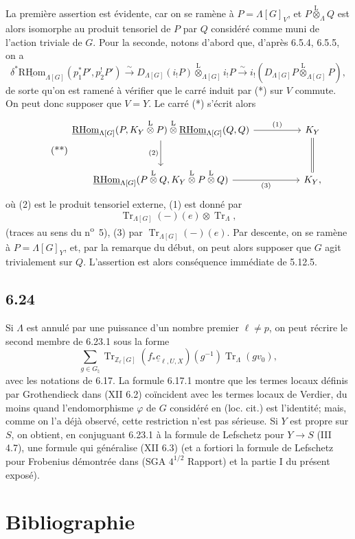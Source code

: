 \documentclass[11pt]{article}
\providecommand{\RHom}{\mathrm{RHom}}
\providecommand{\uRHom}{\underline{\RHom}}
\providecommand{\Tr}{\operatorname{Tr}}
\providecommand{\Tr}{\operatorname{Tr}}
\providecommand{\lten}{\overset{\mathrm L}{\otimes}}
\providecommand{\Tr}{\operatorname{Tr}}
\providecommand{\RHom}{\mathrm{RHom}}
\providecommand{\lten}{\overset{\mathrm L}{\otimes}}
\providecommand{\RHom}{\mathrm R\mathcal{H}om}
\providecommand{\lten}{\overset{\mathrm L}{\otimes}}
\providecommand{\Tr}{\operatorname{Tr}}
\providecommand{\lten}{\overset{\mathrm L}{\otimes}}
\providecommand{\lten}{\overset{\mathrm L}{\otimes}}
\providecommand{\lten}{\overset{\mathrm L}{\otimes}}
\providecommand{\RHom}{\mathrm{RHom}}
\providecommand{\Tr}{\operatorname{Tr}}
\providecommand{\lten}{\overset{\mathrm L}{\otimes}}
\begin{document}
La première assertion est évidente, car on se ramène à $P=\Lambda[G]_V$, et $P\lten_{\Lambda}Q$ est alors isomorphe au produit tensoriel de $P$ par $Q$ considéré comme muni de l'action triviale de $G$. Pour la seconde, notons d'abord que, d'après 6.5.4, 6.5.5, on a
\[
\delta^*\uRHom_{\Lambda[G]}(p_1^*P',p_2^!P')
\xrightarrow{\sim}
D_{\Lambda[G]}(i_!P)\lten_{\Lambda[G]} i_!P
\xrightarrow{\sim}
i_!(D_{\Lambda[G]}P\lten_{\Lambda[G]}P),
\]
de sorte qu'on est ramené à vérifier que le carré induit par (*) sur $V$ commute. On peut donc supposer que $V=Y$. Le carré (*) s'écrit alors
\begin{equation}
\tag{**}
\begin{tikzcd}[column sep=huge,row sep=large]
\uRHom_{\Lambda[G]}(P,K_Y\lten P)\lten\uRHom_{\Lambda[G]}(Q,Q)
  \arrow[r,"(1)"] \arrow[d,"(2)"']
& K_Y \arrow[d,equal]\\
\uRHom_{\Lambda[G]}(P\lten Q,K_Y\lten P\lten Q) \arrow[r,"(3)"']
& K_Y ,
\end{tikzcd}
\end{equation}
où (2) est le produit tensoriel externe, (1) est donné par
\[
\Tr_{\Lambda[G]}(-)(e)\otimes\Tr_{\Lambda},
\]
(traces au sens du n\textsuperscript{o}~5), (3) par $\Tr_{\Lambda[G]}(-)(e)$. Par descente, on se ramène à $P=\Lambda[G]_Y$, et, par la remarque du début, on peut alors supposer que $G$ agit trivialement sur $Q$. L'assertion est alors conséquence immédiate de 5.12.5.

\subsection*{6.24}
Si $\Lambda$ est annulé par une puissance d'un nombre premier $\ell\ne p$, on peut récrire le second membre de 6.23.1 sous la forme
\[
\sum_{g\in G_{\natural}}
\Tr_{\mathbb Z_{\ell}[G]}(f_*\underline c_{\ell,U,X})(g^{-1})
\Tr_{\Lambda}(gv_0),
\]
avec les notations de 6.17. La formule 6.17.1 montre que les termes locaux définis par Grothendieck dans (XII 6.2) coïncident avec les termes locaux de Verdier, du moins quand l'endomorphisme $\varphi$ de $G$ considéré en (loc. cit.) est l'identité; mais, comme on l'a déjà observé, cette restriction n'est pas sérieuse. Si $Y$ est propre sur $S$, on obtient, en conjuguant 6.23.1 à la formule de Lefschetz pour $Y\to S$ (III 4.7), une formule qui généralise (XII 6.3) (et a fortiori la formule de Lefschetz pour Frobenius démontrée dans (SGA $4^{1/2}$ Rapport) et la partie I du présent exposé).

\section*{Bibliographie}
\end{document}
